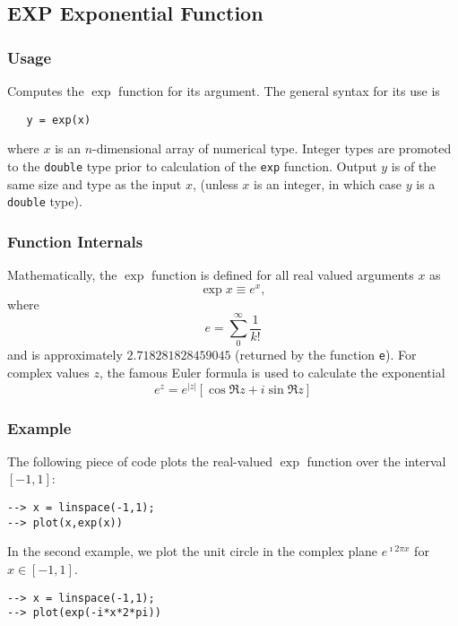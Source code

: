 %
%
%
\subsection{EXP Exponential Function}
\subsubsection{Usage}
Computes the $\exp$ function for its argument.  The general
syntax for its use is
\begin{verbatim}
   y = exp(x)
\end{verbatim}
where $x$ is an $n$-dimensional array of numerical type.
Integer types are promoted to the \verb|double| type prior to
calculation of the \verb|exp| function.  Output $y$ is of the
same size and type as the input $x$, (unless $x$ is an
integer, in which case $y$ is a \verb|double| type).
\subsubsection{Function Internals}
Mathematically, the $\exp$ function is defined for all real
valued arguments $x$ as
\[
  \exp x \equiv e^{x},
\]
where
\[
  e = \sum_{0}^{\infty} \frac{1}{k!}
\]
and is approximately $2.718281828459045$ (returned by the function 
\verb|e|).  For complex values
$z$, the famous Euler formula is used to calculate the 
exponential
\[
  e^{z} = e^{|z|} \left[ \cos \Re z + i \sin \Re z \right]
\]
\subsubsection{Example}
The following piece of code plots the real-valued $\exp$
function over the interval $[-1,1]$:
\begin{verbatim}
--> x = linspace(-1,1);
--> plot(x,exp(x))
\end{verbatim}
In the second example, we plot the unit circle in the complex plane $e^{\imath 2 \pi x}$ for $x \in [-1,1]$.
\begin{verbatim}
--> x = linspace(-1,1);
--> plot(exp(-i*x*2*pi))
\end{verbatim}
